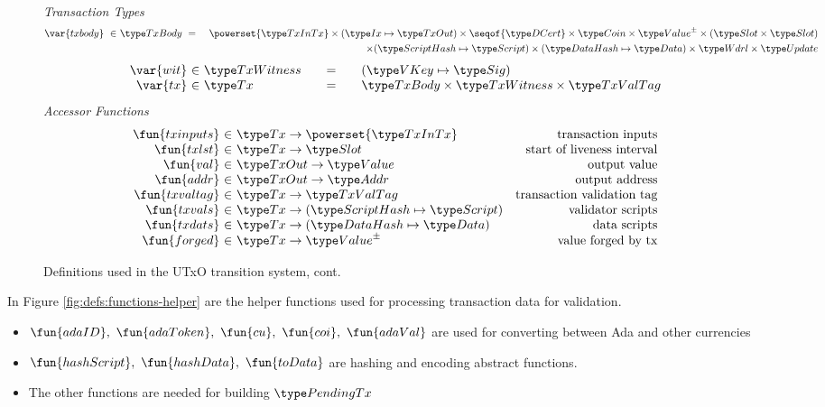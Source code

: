 \begin{figure*}[htb]
  \emph{Transaction Types}
  \begin{align*}
    \var{txbody} ~\in~
    & \TxBody ~=~
    & \powerset{\TxInTx} \times (\Ix \mapsto \TxOut) \times \seqof{\DCert}
      \times \Coin \times \ValuePM \times (\Slot\times\Slot) \\
    &~& \times (\HashScr \mapsto \Script) \times (\HashDat \mapsto \Data)
    \times \Wdrl \times \Update
  \end{align*}
  \begin{equation*}
    \begin{array}{r@{~\in~}l@{\qquad=\qquad}l}
      \var{wit} & \TxWitness & (\VKey \mapsto \Sig)
      \\
      \var{tx}
      & \Tx
      & \TxBody \times \TxWitness \times \TxValTag
    \end{array}
  \end{equation*}
  \emph{Accessor Functions}
  \begin{equation*}
    \begin{array}{r@{~\in~}lr}
      \fun{txinputs} & \Tx \to \powerset{\TxInTx} & \text{transaction inputs} \\
      \fun{txlst} & \Tx \to \Slot & \text{start of liveness interval} \\
      \fun{val} & \TxOut \to \Value & \text{output value} \\
      \fun{addr} & \TxOut \to \Addr & \text{output address} \\
      \fun{txvaltag} & \Tx \to \TxValTag & \text{transaction validation tag}\\
      \fun{txvals} & \Tx \to (\HashScr \mapsto \Script) & \text{validator scripts}\\
      \fun{txdats} & \Tx \to (\HashDat \mapsto \Data) & \text{data scripts}\\
      \fun{forged} & \Tx \to \ValuePM & \text{value forged by tx}\\
    \end{array}
  \end{equation*}
  \caption{Definitions used in the UTxO transition system, cont.}
  \label{fig:defs:utxo-shelley-2}
\end{figure*}


In Figure \ref{fig:defs:functions-helper} are the helper functions used for
processing transaction data for validation.

\begin{itemize}
  \item $\fun{adaID},~\fun{adaToken},~\fun{cu},~\fun{coi},~\fun{adaVal}$ are used
  for converting between Ada and other currencies
  \item $\fun{hashScript},~ \fun{hashData},~\fun{toData}$ are hashing and encoding
  abstract functions.
  \item The other functions are needed for building $\PendingTx$
\end{itemize}

